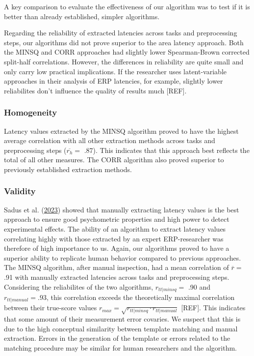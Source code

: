 \documentclass[
  man,floatsintext]{apa7}
\begin{document}
A key comparison to evaluate the effectiveness of our algorithm was to test if it is better than already established, simpler algorithms.

Regarding the reliability of extracted latencies across tasks and preprocessing steps, our algorithms did not prove superior to the area latency approach. Both the MINSQ and CORR approaches had slightly lower Spearman-Brown corrected split-half correlations. However, the differences in reliability are quite small and only carry low practical implications. If the researcher uses latent-variable approaches in their analysis of ERP latencies, for example, slightly lower reliabilites don't influence the quality of results much {[}REF{]}.

\hypertarget{homogeneity-2}{%
\subsubsection{Homogeneity}\label{homogeneity-2}}

Latency values extracted by the MINSQ algorithm proved to have the highest average correlation with all other extraction methods across tasks and preprocessing steps (\(\overline{r_{h}} =\) .87). This indicates that this approach best reflects the total of all other measures. The CORR algorithm also proved superior to previously established extraction methods.

\hypertarget{validity}{%
\subsubsection{Validity}\label{validity}}

Sadus et al. (\protect\hyperlink{ref-sadus2023multiverse}{2023}) showed that manually extracting latency values is the best approach to ensure good psychometric properties and high power to detect experimental effects. The ability of an algorithm to extract latency values correlating highly with those extracted by an expert ERP-researcher was therefore of high importance to us.
Again, our algorithms proved to have a superior ability to replicate human behavior compared to previous approaches. The MINSQ algorithm, after manual inspection, had a mean correlation of \(\overline{r} =\) .91 with manually extracted latencies across tasks and preprocessing steps. Considering the reliabilites of the two algorithms, \(r_{tt|minsq} =\) .90 and \(r_{tt|manual} = .93\), this correlation exceeds the theoretically maximal correlation between their true-score values \(r_{max} = \sqrt{r_{tt|minsq} \cdot r_{tt|manual}}\) {[}REF{]}. This indicates that some amount of their measurement error covaries. We suspect that this is due to the high conceptual similarity between template matching and manual extraction. Errors in the generation of the template or errors related to the matching procedure may be similar for human researchers and the algorithm.
\end{document}
